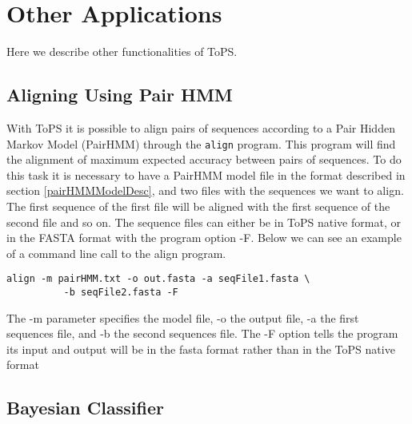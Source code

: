\chapter{Other Applications}

Here we describe other functionalities of ToPS. 
\section{Aligning Using Pair HMM}
With ToPS it is possible to align pairs of sequences according to a Pair Hidden Markov Model (PairHMM) through the \texttt{align} program. This program will find the alignment of maximum expected accuracy between pairs of sequences. To do this task it is necessary to have a PairHMM model file in the format described in section \ref{pairHMMModelDesc}, and two files with the sequences we want to align. The first sequence of the first file will be aligned with the first sequence of the second file and so on.  The sequence files can either be in ToPS native format, or in the FASTA format with the program option -F. Below we can see an example of a command line call to the align program.
\vspace{1em}
\begin{Verbatim}[frame=single, label={Command line}]
align -m pairHMM.txt -o out.fasta -a seqFile1.fasta \
          -b seqFile2.fasta -F
\end{Verbatim}

 The -m parameter specifies the model file, -o the output file, -a the first sequences file,  and -b the second sequences file. The -F option tells the program its input and output will be in the fasta format rather than in the ToPS native format






\section{Bayesian Classifier}


